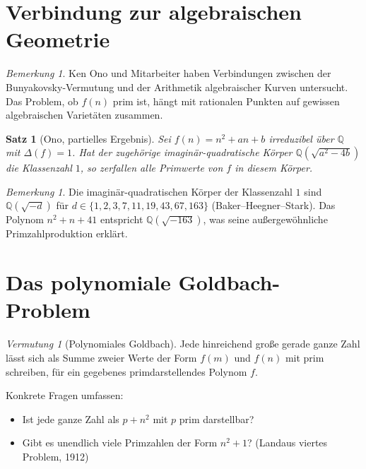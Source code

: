 \documentclass[12pt,a4paper]{amsart}
\newtheorem{satz}[theorem]{Satz}
\theoremstyle{definition}
\theoremstyle{remark}
\newtheorem{bemerkung}[theorem]{Bemerkung}
\newtheorem{vermutung}[theorem]{Vermutung}
\newcommand{\Q}{\mathbb{Q}}
\begin{document}
\section{Verbindung zur algebraischen Geometrie}

\begin{bemerkung}
Ken Ono und Mitarbeiter haben Verbindungen zwischen der Bunyakovsky-Vermutung
und der Arithmetik algebraischer Kurven untersucht.
Das Problem, ob $f(n)$ prim ist, hängt mit rationalen Punkten auf gewissen
algebraischen Varietäten zusammen.
\end{bemerkung}

\begin{satz}[Ono, partielles Ergebnis]
Sei $f(n) = n^2 + an + b$ irreduzibel über $\Q$ mit $\Delta(f) = 1$.
Hat der zugehörige imaginär-quadratische Körper $\Q(\sqrt{a^2-4b})$
die Klassenzahl $1$, so zerfallen alle Primwerte von $f$ in diesem Körper.
\end{satz}

\begin{bemerkung}
Die imaginär-quadratischen Körper der Klassenzahl $1$ sind
$\Q(\sqrt{-d})$ für $d \in \{1, 2, 3, 7, 11, 19, 43, 67, 163\}$
(Baker--Heegner--Stark).
Das Polynom $n^2 + n + 41$ entspricht $\Q(\sqrt{-163})$, was seine
außergewöhnliche Primzahlproduktion erklärt.
\end{bemerkung}

\section{Das polynomiale Goldbach-Problem}

\begin{vermutung}[Polynomiales Goldbach]
\label{verm:polygold}
Jede hinreichend große gerade ganze Zahl lässt sich als Summe zweier Werte
der Form $f(m)$ und $f(n)$ mit prim schreiben, für ein gegebenes
primdarstellendes Polynom $f$.
\end{vermutung}

Konkrete Fragen umfassen:
\begin{itemize}[nosep]
  \item Ist jede ganze Zahl als $p + n^2$ mit $p$ prim darstellbar?
  \item Gibt es unendlich viele Primzahlen der Form $n^2 + 1$?
        (Landaus viertes Problem, 1912)
\end{itemize}
\end{document}
